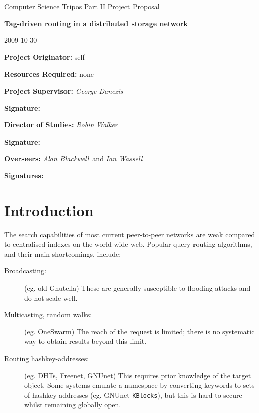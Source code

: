 \documentclass[12pt]{article}
\begin{document}
\thispagestyle{empty}

\medskip
{}
\medskip
{}

\vfil

\centerline{\large Computer Science Tripos Part II Project Proposal}
\vspace{0.4in}
\centerline{\Large\bf Tag-driven routing in a distributed storage network}
\vspace{0.3in}
\centerline{\large 2009-10-30}

\vspace{0.5in}

{\bf Project Originator:} self

\vspace{0.1in}

{\bf Resources Required:} none

\vspace{0.5in}

{\bf Project Supervisor:} \emph{George Danezis}

\vspace{0.2in}

{\bf Signature:}

\vspace{0.5in}

{\bf Director of Studies:} \emph{Robin Walker}

\vspace{0.2in}

{\bf Signature:}

\vspace{0.5in}

{\bf Overseers:} \emph{Alan Blackwell}\ and \emph{Ian Wassell}

\vspace{0.2in}

{\bf Signatures:}

\vfil
\eject

\section*{Introduction}

The search capabilities of most current peer-to-peer networks are weak compared
to centralised indexes on the world wide web. Popular query-routing algorithms,
and their main shortcomings, include:

\begin{description}
\item [Broadcasting:] (eg. old Gnutella) These are generally susceptible to
  flooding attacks and do not scale well.
\item [Multicasting, random walks:] (eg. OneSwarm) The reach of the request is
  limited; there is no systematic way to obtain results beyond this limit.
\item [Routing hashkey-addresses:] (eg. DHTs, Freenet, GNUnet) This requires
  prior knowledge of the target object. Some systems emulate a namespace by
  converting keywords to sets of hashkey addresses (eg. GNUnet {\tt KBlocks}),
  but this is hard to secure whilst remaining globally open.
\end{description}
\end{document}
